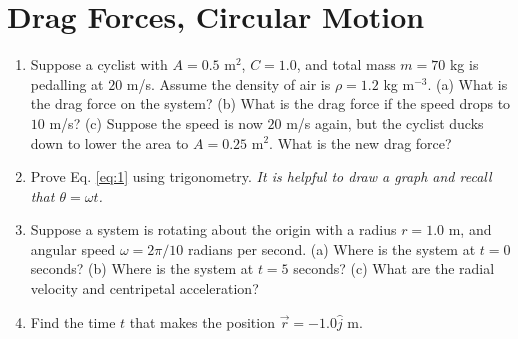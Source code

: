 \documentclass{article}
\begin{document}
\section{Drag Forces, Circular Motion}
\begin{enumerate}
\item Suppose a cyclist with $A = 0.5$ m$^2$, $C = 1.0$, and total mass $m = 70$ kg is pedalling at $20$ m/s.  Assume the density of air is $\rho = 1.2$ kg m$^{-3}$.  (a) What is the drag force on the system? (b) What is the drag force if the speed drops to $10$ m/s? (c)  Suppose the speed is now $20$ m/s again, but the cyclist ducks down to lower the area to $A = 0.25$ m$^2$.  What is the new drag force? \\ \vspace{1.5cm}
\item Prove Eq. \ref{eq:1} using trigonometry.  \textit{It is helpful to draw a graph and recall that $\theta = \omega t$.} \\ \vspace{2cm}
\item Suppose a system is rotating about the origin with a radius $r = 1.0$ m, and angular speed $\omega = 2\pi/10$ radians per second. (a) Where is the system at $t = 0$ seconds?  (b) Where is the system at $t=5$ seconds? (c) What are the radial velocity and centripetal acceleration? \\ \vspace{2cm}
\item Find the time $t$ that makes the position $\vec{r} = -1.0\hat{j}$ m.
\end{enumerate}
\end{document}
